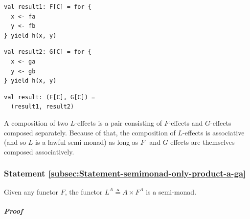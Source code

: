 \begin{center}
\begin{minipage}[t]{0.3\columnwidth}%
\begin{lstlisting}
val result1: F[C] = for {
  x <- fa
  y <- fb
} yield h(x, y)
\end{lstlisting}
%
\end{minipage}\hfill{} %
\begin{minipage}[t]{0.3\columnwidth}%
\begin{lstlisting}
val result2: G[C] = for {
  x <- ga
  y <- gb
} yield h(x, y)
\end{lstlisting}
%
\end{minipage}\hfill{} %
\begin{minipage}[t]{0.35\columnwidth}%
\begin{lstlisting}
val result: (F[C], G[C]) =
  (result1, result2)
\end{lstlisting}
%
\end{minipage}\vspace{-0.35\baselineskip}
\par\end{center}

A composition of two $L$-effects is a pair consisting of $F$-effects
and $G$-effects composed separately. Because of that, the composition
of $L$-effects is associative (and so $L$ is a lawful semi-monad)
as long as $F$- and $G$-effects are themselves composed associatively.

\subsubsection{Statement \label{subsec:Statement-semimonad-only-product-a-ga}\ref{subsec:Statement-semimonad-only-product-a-ga}}

Given any functor $F$, the functor $L^{A}\triangleq A\times F^{A}$
is a semi-monad.

\subparagraph{Proof}

